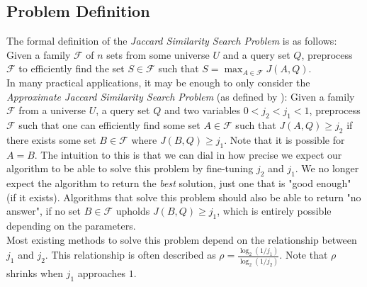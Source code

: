 \subsection{Problem Definition}
The formal definition of the \textit{Jaccard Similarity Search Problem} is as follows:
Given a family $\mathcal{F}$ of $n$ sets from some universe $U$ and a query set $Q$, preprocess $\mathcal{F}$ to efficiently find the set $S\in \mathcal{F}$ such that $S = \max_{A\in \mathcal{F}}J(A,Q)$. \\
In many practical applications, it may be enough to only consider the \textit{Approximate Jaccard Similarity Search Problem} (as defined by \citet{fast-similarity-search}): Given a family $\mathcal{F}$ from a universe $U$, a query set $Q$ and two variables $0 < j_2 < j_1 < 1$, preprocess $\mathcal{F}$ such that one can efficiently find some set $A \in \mathcal{F}$ such that $J(A,Q) \geq j_2$ if there exists some set $B \in \mathcal{F}$ where $J(B,Q) \geq j_1$. Note that it is possible for $A = B$. The intuition to this is that we can dial in how precise we expect our algorithm to be able to solve this problem by fine-tuning $j_2$ and $j_1$. We no longer expect the algorithm to return the \textit{best} solution, just one that is "good enough" (if it exists). Algorithms that solve this problem should also be able to return "no answer", if no set $B\in \mathcal{F}$ upholds $J(B,Q)\geq j_1$, which is entirely possible depending on the parameters. \\
Most existing methods to solve this problem depend on the relationship between $j_1$ and $j_2$. This relationship is often described as $\rho=\frac{\log_2(1/j_1)}{\log_2(1/j_2)}$. Note that $\rho$ shrinks when $j_1$ approaches $1$.

